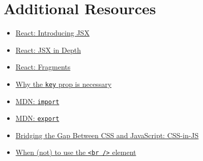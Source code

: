 \section{Additional Resources}

\begin{itemize}[leftmargin=*]
    \item \href{https://reactjs.org/docs/introducing-jsx.html}{React: Introducing JSX}
    \item \href{https://reactjs.org/docs/jsx-in-depth.html}{React: JSX in Depth}
    \item \href{https://reactjs.org/docs/fragments.html}{React: Fragments}
    \item \href{https://egghead.io/lessons/react-use-the-key-prop-when-rendering-a-list-with-react}{Why the \texttt{key} prop is necessary}
    \item \href{https://developer.mozilla.org/en-US/docs/Web/JavaScript/Reference/Statements/import}{MDN: \texttt{import}}
    \item \href{https://developer.mozilla.org/en-US/docs/Web/JavaScript/Reference/Statements/export}{MDN: \texttt{export}}
    \item \href{https://css-tricks.com/bridging-the-gap-between-css-and-javascript-css-in-js/}{Bridging the Gap Between CSS and JavaScript: CSS-in-JS}
    \item \href{https://webplatform.news/issues/2020-04-29#when-not-to-use-the-br-element}{When (not) to use the \texttt{<br />} element}
\end{itemize}
